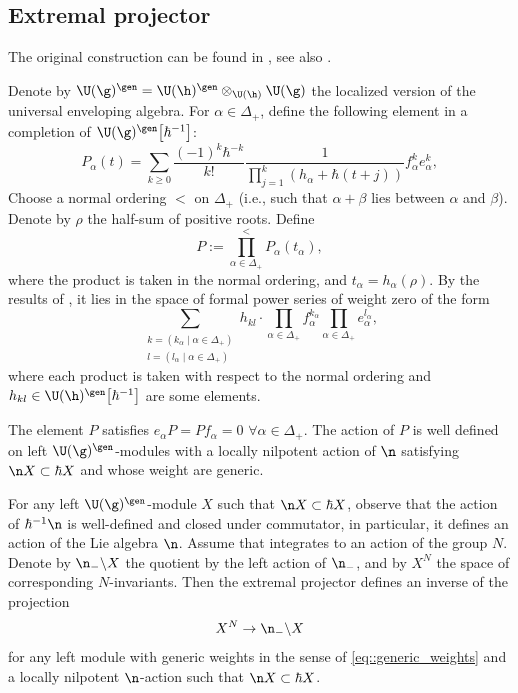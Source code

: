	\subsection{Extremal projector}
	\label{subsect::extremal_proj}
	
	The original construction can be found in \cite{AsherovaSmirnovTolstoy}, see also \cite{ZhelobenkoSalgebras}.
	
	Denote by $\U(\g)^{\gen} = \U (\h)^{\gen} \otimes_{\U(\h)} \U(\g)$ the localized version of the universal enveloping algebra. For $\alpha\in \Delta_+$, define the following element in a completion of $\U(\g)^{\gen}\bigl[\hbar^{-1}\bigr]$:
	\begin{equation}
		\label{eq::extremal_proj_term}
		P_{\alpha}(t) = \sum\limits_{k\geq 0} \frac{(-1)^k \hbar^{-k}}{k!} \frac{1}{\prod_{j=1}^k (h_{\alpha} + \hbar(t+j))} f_{\alpha}^k e_{\alpha}^k,
	\end{equation}
	Choose a normal ordering $<$ on $\Delta_+$ (i.e., such that $\alpha + \beta$ lies between $\alpha$ and $\beta$). Denote by $\rho$ the half-sum of positive roots. Define
	\begin{equation}
		\label{eq::extremal_proj}
		P := \prod_{\alpha \in \Delta_+}^{<} P_{\alpha}(t_{\alpha}),
	\end{equation}
	where the product is taken in the normal ordering, and $t_{\alpha} = h_{\alpha}(\rho)$. By the results of \cite{ZhelobenkoCocycles}, it lies in the space of formal power series of weight zero of the form
	\[
	\sum\limits_{\substack{k = (k_{\alpha} \mid \alpha\in \Delta_+) \\ l = (l_{\alpha} \mid \alpha\in \Delta_+)}} h_{kl} \cdot \prod_{\alpha \in \Delta_+} f_{\alpha}^{k_{\alpha}} \prod_{\alpha \in \Delta_+} e_{\alpha}^{l_{\alpha}},
	\]
	where each product is taken with respect to the normal ordering and $h_{kl} \in \U(\h)^{\gen}\bigl[\hbar^{-1}\bigr]$ are some elements.
	
	\begin{Theorem}
		\label{thm::extremal_proj}
		The element $P$ satisfies
$
		e_{\alpha} P = P f_{\alpha} = 0 $ $\forall \alpha \in \Delta_+$.
		The action of $P$ is well defined on left $\U(\g)^{\gen}$-modules with a locally nilpotent action of $\n$ satisfying $\n X \subset \hbar X$ and whose weight are generic.
	\end{Theorem}
	
	For any left $\U(\g)^{\gen}$-module $X$ such that $\n X \subset \hbar X$, observe that the action of $\hbar^{-1} \n$ is well-defined and closed under commutator, in particular, it defines an action of the Lie algebra $\n$. Assume that integrates to an action of the group $N$. Denote by $\n_- \backslash X$ the quotient by the left action of $\n_-$, and by $X^{N}$ the space of corresponding $N$-invariants. Then the extremal projector defines an inverse of the projection
	\begin{equation}
		\label{eq::extremal_proj_iso_inv_quot}
		X^{N} \rightarrow \n_- \backslash X
	\end{equation}
	for any left module with generic weights in the sense of \eqref{eq::generic_weights} and a locally nilpotent $\n$-action such that $\n X \subset \hbar X$.
	
